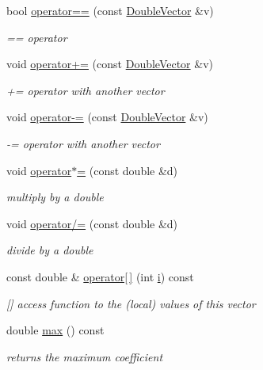 \begin{DoxyCompactItemize}
bool \hyperlink{classoomph_1_1DoubleVector_a4da2f710fccabe5a5349d8a5238b36cc}{operator==} (const \hyperlink{classoomph_1_1DoubleVector}{Double\+Vector} \&v)
\begin{DoxyCompactList}\small\item\em == operator \end{DoxyCompactList}\item 
void \hyperlink{classoomph_1_1DoubleVector_a2724cce5d107b7e6535d9ae071d6d603}{operator+=} (const \hyperlink{classoomph_1_1DoubleVector}{Double\+Vector} \&v)
\begin{DoxyCompactList}\small\item\em += operator with another vector \end{DoxyCompactList}\item 
void \hyperlink{classoomph_1_1DoubleVector_aaeb013d502cff3ee0b7e036945ece1ea}{operator-\/=} (const \hyperlink{classoomph_1_1DoubleVector}{Double\+Vector} \&v)
\begin{DoxyCompactList}\small\item\em -\/= operator with another vector \end{DoxyCompactList}\item 
void \hyperlink{classoomph_1_1DoubleVector_a691d884622e4221e61436f2bc457c6e2}{operator$\ast$=} (const double \&d)
\begin{DoxyCompactList}\small\item\em multiply by a double \end{DoxyCompactList}\item 
void \hyperlink{classoomph_1_1DoubleVector_ab3cb62619709401a0e8f4bc4bee9dff3}{operator/=} (const double \&d)
\begin{DoxyCompactList}\small\item\em divide by a double \end{DoxyCompactList}\item 
const double \& \hyperlink{classoomph_1_1DoubleVector_a54cec3cc3e28f6781c28c0dbcfcffa3e}{operator\mbox{[}$\,$\mbox{]}} (int \hyperlink{cfortran_8h_adb50e893b86b3e55e751a42eab3cba82}{i}) const
\begin{DoxyCompactList}\small\item\em \mbox{[}\mbox{]} access function to the (local) values of this vector \end{DoxyCompactList}\item 
double \hyperlink{classoomph_1_1DoubleVector_a4c176b562f503701d65882a930d5b8f5}{max} () const
\begin{DoxyCompactList}\small\item\em returns the maximum coefficient \end{DoxyCompactList}\item 

\end{DoxyCompactItemize}
